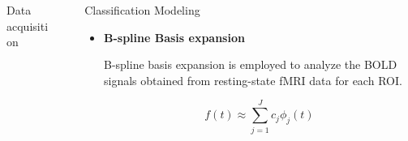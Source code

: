 \documentclass[final]{beamer}
\newlength{\sepwidth}
\newlength{\colwidth}
\newcommand{\separatorcolumn}{\begin{column}{\sepwidth}\end{column}}
\begin{document}
\begin{frame}[t]
\begin{columns}[t]
\begin{column}{\colwidth}
\begin{block}{Data acquisition}
\end{block}











            















\end{column}
\separatorcolumn
\begin{column}{\colwidth}








 \begin{block}{Classification Modeling}
   \begin{itemize}
            \item  \textbf{B-spline Basis expansion}
            
            B-spline basis expansion is employed to analyze the BOLD signals obtained from resting-state fMRI data for each ROI.
                
        
            \begin{equation*}
                f(t) \approx \sum_{j=1}^{J} c_j \phi_j(t)
            \end{equation*}
    \end{itemize}
\end{block}




\end{column}
\end{columns}
\end{frame}
\end{document}
